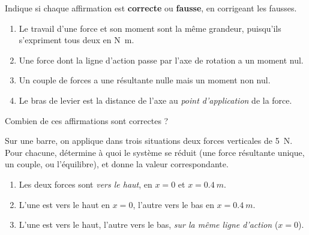 \documentclass[11pt,a4paper]{article}
\begin{document}
\begin{exo}
Indique si chaque affirmation est \textbf{correcte} ou \textbf{fausse}, en corrigeant les fausses.
\begin{enumerate}[label=\alph*)]
  \item Le travail d'une force et son moment sont la même grandeur, puisqu'ils s'expriment tous deux
        en \si{\newton\metre}.
  \item Une force dont la ligne d'action passe par l'axe de rotation a un moment nul.
  \item Un couple de forces a une résultante nulle mais un moment non nul.
  \item Le bras de levier est la distance de l'axe au \emph{point d'application} de la force.
\end{enumerate}
Combien de ces affirmations sont correctes ?
\end{exo}

\begin{exo}
Sur une barre, on applique dans trois situations deux forces verticales de \qty{5}{N}. Pour chacune,
détermine à quoi le système se réduit (une force résultante unique, un couple, ou l'équilibre), et
donne la valeur correspondante.
\begin{enumerate}[label=\alph*)]
  \item Les deux forces sont \emph{vers le haut}, en $x=0$ et $x=\qty{0.4}{m}$.
  \item L'une est vers le haut en $x=0$, l'autre vers le bas en $x=\qty{0.4}{m}$.
  \item L'une est vers le haut, l'autre vers le bas, \emph{sur la même ligne d'action} ($x=0$).
\end{enumerate}
\end{exo}
\end{document}
